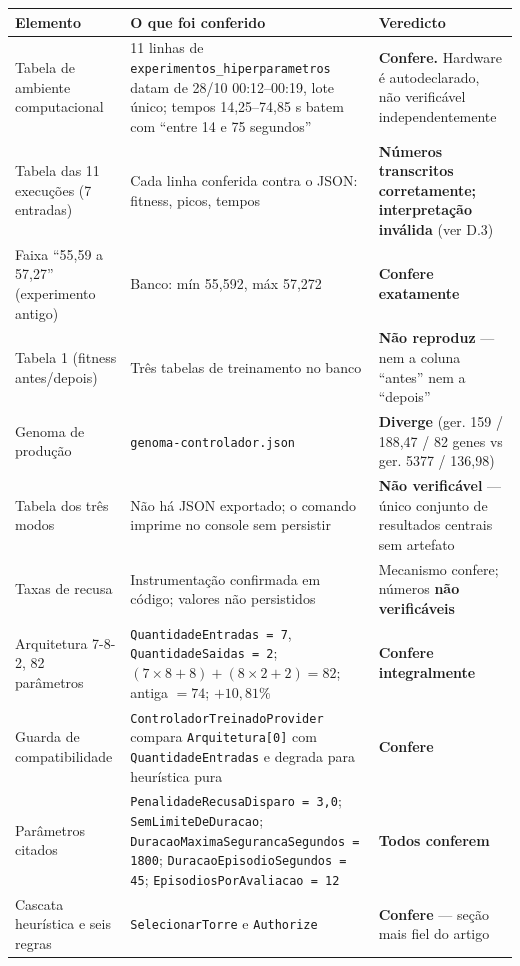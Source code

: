 \documentclass[11pt,a4paper]{article}
\begin{document}
\begin{longtable}{|p{3.6cm}|p{6.4cm}|p{4.6cm}|}
\hline
\textbf{Elemento} & \textbf{O que foi conferido} & \textbf{Veredicto} \\
\hline
\endhead
Tabela de ambiente computacional & 11 linhas de \texttt{experimentos\_hiperparametros} datam de
28/10 00:12--00:19, lote único; tempos 14,25--74,85 s batem com ``entre 14 e 75 segundos'' &
\textbf{Confere.} Hardware é autodeclarado, não verificável independentemente \\
\hline
Tabela das 11 execuções (7 entradas) & Cada linha conferida contra o JSON: fitness, picos, tempos &
\textbf{Números transcritos corretamente; interpretação inválida} (ver D.3) \\
\hline
Faixa ``55,59 a 57,27'' (experimento antigo) & Banco: mín 55,592, máx 57,272 &
\textbf{Confere exatamente} \\
\hline
Tabela 1 (fitness antes/depois) & Três tabelas de treinamento no banco &
\textbf{Não reproduz} --- nem a coluna ``antes'' nem a ``depois'' \\
\hline
Genoma de produção & \texttt{genoma-controlador.json} &
\textbf{Diverge} (ger. 159 / 188,47 / 82 genes vs ger. 5377 / 136,98) \\
\hline
Tabela dos três modos & Não há JSON exportado; o comando imprime no console sem persistir &
\textbf{Não verificável} --- único conjunto de resultados centrais sem artefato \\
\hline
Taxas de recusa & Instrumentação confirmada em código; valores não persistidos &
Mecanismo confere; números \textbf{não verificáveis} \\
\hline
Arquitetura 7-8-2, 82 parâmetros & \texttt{QuantidadeEntradas = 7}, \texttt{QuantidadeSaidas = 2};
$(7{\times}8{+}8)+(8{\times}2{+}2) = 82$; antiga $= 74$; $+10{,}81\%$ & \textbf{Confere integralmente} \\
\hline
Guarda de compatibilidade & \texttt{ControladorTreinadoProvider} compara
\texttt{Arquitetura[0]} com \texttt{QuantidadeEntradas} e degrada para heurística pura &
\textbf{Confere} \\
\hline
Parâmetros citados & \texttt{PenalidadeRecusaDisparo = 3,0}; \texttt{SemLimiteDeDuracao};
\texttt{DuracaoMaximaSegurancaSegundos = 1800}; \texttt{DuracaoEpisodioSegundos = 45};
\texttt{EpisodiosPorAvaliacao = 12} & \textbf{Todos conferem} \\
\hline
Cascata heurística e seis regras & \texttt{SelecionarTorre} e \texttt{Authorize} &
\textbf{Confere} --- seção mais fiel do artigo \\

\end{longtable}
\end{document}
